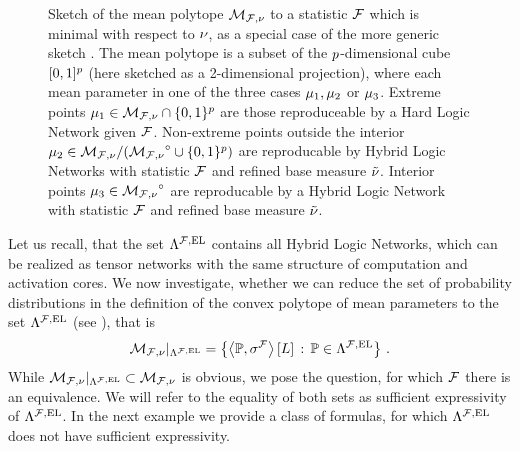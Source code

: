 \begin{figure}[t!]
\begin{center}
	
\end{center}
\caption{Sketch of the mean polytope ${\mathcal{M}_{\mathcal{F},\nu}}$ to a statistic $\mathcal{F}$ which is minimal with respect to $\nu$, as a special case of the more generic sketch .
	The mean polytope is a subset of the $p$-dimensional cube $[0,1]^p$ (here sketched as a 2-dimensional projection), where each mean parameter in one of the three cases $\mu_{1},\mu_{2}$ or $\mu_{3}$.
	Extreme points $\mu_{1}\in\mathcal{M}_{\mathcal{F},\nu}\cap\{0,1\}^{p}$ are those reproduceable by a Hard Logic Network given $\mathcal{F}$.
	Non-extreme points outside the interior $\mu_{2}\in\mathcal{M}_{\mathcal{F},\nu}/({\mathcal{M}_{\mathcal{F},\nu}}^{\circ}\cup\{0,1\}^{p})$ are reproducable by Hybrid Logic Networks with statistic $\mathcal{F}$ and refined base measure $\tilde{\nu}$.
	Interior points $\mu_{3}\in{\mathcal{M}_{\mathcal{F},\nu}}^{\circ}$ are reproducable by a Hybrid Logic Network with statistic $\mathcal{F}$ and refined base measure $\tilde{\nu}$.
}\label{fig:meansetSketch}
\end{figure}




Let us recall, that the set $\Lambda^{\mathcal{F},\mathrm{EL}}$ contains all Hybrid Logic Networks, which can be realized as tensor networks with the same structure of computation and activation cores.
We now investigate, whether we can reduce the set of probability distributions in the definition of the convex polytope of mean parameters to the set $\Lambda^{\mathcal{F},\mathrm{EL}}$ (see ), that is
\begin{align*}
	\mathcal{M}_{\mathcal{F},\nu}|_{\Lambda^{\mathcal{F},\mathrm{EL}}} = \left\{ \left\langle \mathbb{P},\sigma^{\mathcal{F}}\right\rangle \left[ L \right] \, : \, \mathbb{P}\in\Lambda^{\mathcal{F},\mathrm{EL}} \right\} \, .
\end{align*}
While $\mathcal{M}_{\mathcal{F},\nu}|_{\Lambda^{\mathcal{F},\mathrm{EL}}}\subset\mathcal{M}_{\mathcal{F},\nu}$ is obvious, we pose the question, for which $\mathcal{F}$ there is an equivalence.
We will refer to the equality of both sets as sufficient expressivity of $\Lambda^{\mathcal{F},\mathrm{EL}}$.
In the next example we provide a class of formulas, for which $\Lambda^{\mathcal{F},\mathrm{EL}}$ does not have sufficient expressivity.

